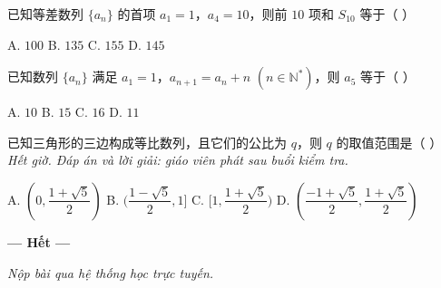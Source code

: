 \documentclass[11pt, a4paper]{article}
\begin{document}
\begin{baitap}[22]
已知等差数列 $\{a_n\}$ 的首项 $a_1 = 1$，$a_4 = 10$，则前 $10$ 项和 $S_{10}$ 等于（ ）
\par\vspace{3pt}
\noindent A. $100$ \quad B. $135$ \quad C. $155$ \quad D. $145$
\end{baitap}

\begin{baitap}[23]
已知数列 $\{a_n\}$ 满足 $a_1 = 1$，$a_{n+1} = a_n + n$ $(n \in \mathbb{N}^{*})$，则 $a_5$ 等于（ ）
\par\vspace{3pt}
\noindent A. $10$ \quad B. $15$ \quad C. $16$ \quad D. $11$
\end{baitap}

\begin{baitap}[24]
已知三角形的三边构成等比数列，且它们的公比为 $q$，则 $q$ 的取值范围是（ ） \emph{Hết giờ. Đáp án và lời giải: giáo viên phát sau buổi kiểm tra.}
\par\vspace{3pt}
\noindent A. $(0, \dfrac{1 + \sqrt{5}}{2})$ \quad B. $(\dfrac{1 - \sqrt{5}}{2}, 1]$ \quad C. $[1, \dfrac{1 + \sqrt{5}}{2})$ \quad D. $(\dfrac{-1 + \sqrt{5}}{2}, \dfrac{1 + \sqrt{5}}{2})$
\end{baitap}

\vspace{0.5cm}
\begin{center}
\textbf{--- Hết ---}
\end{center}

\vspace{0.3cm}
\noindent\emph{Nộp bài qua hệ thống học trực tuyến.}
\end{document}
